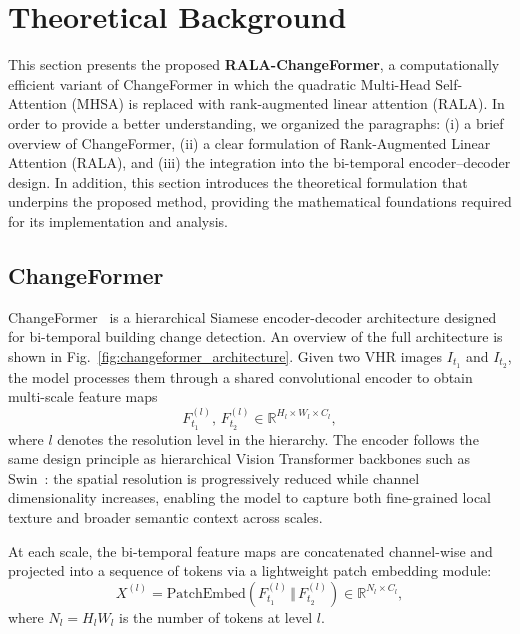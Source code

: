 \documentclass[runningheads]{llncs}
\begin{document}
\section{Theoretical Background}
\label{sec:theoretical}

This section presents the proposed \textbf{RALA-ChangeFormer}, a
computationally efficient variant of ChangeFormer in which the quadratic
Multi-Head Self-Attention (MHSA) is replaced with rank-augmented linear
attention (RALA). In order to provide a better understanding, we organized the
paragraphs: (i) a brief overview of ChangeFormer, (ii) a clear formulation of
Rank-Augmented Linear Attention (RALA), and (iii) the integration into the
bi-temporal encoder–decoder design. In addition, this section introduces the
theoretical formulation that underpins the proposed method, providing the
mathematical foundations required for its implementation and analysis.

\subsection{ChangeFormer}
\label{subsec:cf_overview}

ChangeFormer~\cite{Bandara2022ChangeFormer} is a hierarchical Siamese
encoder-decoder architecture designed for bi-temporal building change detection.
An overview of the full architecture is shown in
Fig.~\ref{fig:changeformer_architecture}. Given two VHR images $I_{t_1}$ and
$I_{t_2}$, the model processes them through a shared convolutional encoder to
obtain multi-scale feature maps
\begin{equation}
F_{t_1}^{(l)},\, F_{t_2}^{(l)} \in \mathbb{R}^{H_l \times W_l \times C_l},
\end{equation}
where $l$ denotes the resolution level in the hierarchy. The encoder follows
the same design principle as hierarchical Vision Transformer backbones such as
Swin~\cite{Teng2023SwinCD}: the spatial resolution is progressively reduced
while channel dimensionality increases, enabling the model to capture both
fine-grained local texture and broader semantic context across scales.

At each scale, the bi-temporal feature maps are concatenated channel-wise and
projected into a sequence of tokens via a lightweight patch embedding module:
\begin{equation}
X^{(l)} = \mathrm{PatchEmbed}\!\left(F_{t_1}^{(l)} \,\Vert\, F_{t_2}^{(l)}\right)
      \in \mathbb{R}^{N_l \times C_l},
\end{equation}
where $N_l = H_lW_l$ is the number of tokens at level $l$.
\end{document}
